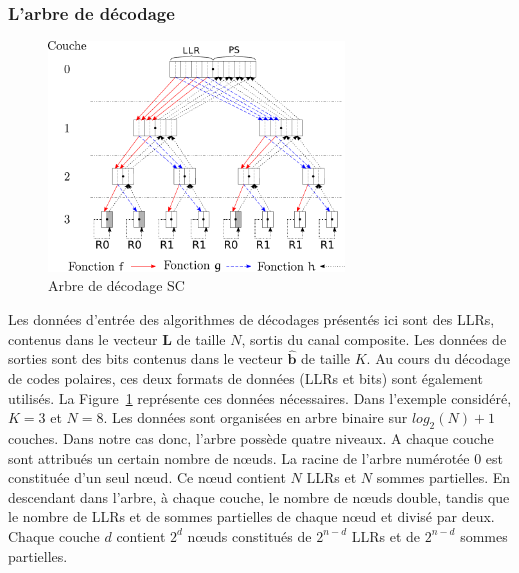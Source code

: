 \subsubsection{L'arbre de décodage}
\begin{figure}[t]
\centering
\includegraphics[width=0.7\textwidth]{main/ch1_fig/sc}
\caption{Arbre de décodage SC}
\label{fig:sc}
\end{figure}
Les données d'entrée des algorithmes de décodages présentés ici sont des LLRs, contenus dans le vecteur $\mathbold{L}$ de taille $N$, sortis du canal composite. Les données de sorties sont des bits contenus dans le vecteur $\mathbold{\hat{b}}$ de taille $K$. Au cours du décodage de codes polaires, ces deux formats de données (LLRs et bits) sont également utilisés. La Figure~\ref{fig:sc} représente ces données nécessaires. Dans l'exemple considéré, $K=3$ et $N=8$. Les données sont organisées en arbre binaire sur $log_2(N) + 1$ couches. Dans notre cas donc, l'arbre possède quatre niveaux. A chaque couche sont attribués un certain nombre de nœuds. La racine de l'arbre numérotée $0$ est constituée d'un seul nœud. Ce nœud contient $N$ LLRs et $N$ sommes partielles. En descendant dans l'arbre, à chaque couche, le nombre de nœuds double, tandis que le nombre de LLRs et de sommes partielles de chaque nœud et divisé par deux. Chaque couche $d$ contient $2^d$ nœuds constitués de $2^{n-d}$ LLRs et de $2^{n-d}$ sommes partielles. 

